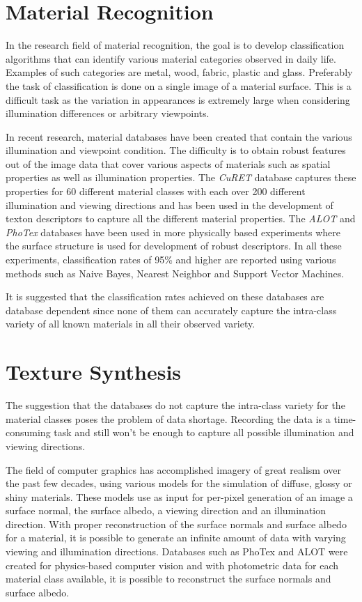 \hypertarget{MaterialRecognition}{
\section{Material Recognition}
}
In the research field of material recognition, the goal is to develop classification algorithms that can identify various material categories observed in daily life. Examples of such categories are metal, wood, fabric, plastic and glass. Preferably the task of classification is done on a single image of a material surface. This is a difficult task as the variation in appearances is extremely large when considering illumination differences or arbitrary viewpoints. 

In recent research, material databases have been created that contain the various illumination and viewpoint condition. The difficulty is to obtain robust features out of the image data that cover various aspects of materials such as spatial properties as well as illumination properties. The {\it CuRET} database captures these properties for 60 different material classes with each over 200 different illumination and viewing directions and has been used in the development of texton descriptors to capture all the different material properties. The {\it ALOT} and {\it PhoTex} databases have been used in more physically based experiments where the surface structure is used for development of robust descriptors. In all these experiments, classification rates of 95\% and higher are reported using various methods such as Naive Bayes, Nearest Neighbor and Support Vector Machines. 

It is suggested that the classification rates achieved on these databases are database dependent since none of them can accurately capture the intra-class variety of all known materials in all their observed variety.

\section{Texture Synthesis}
The suggestion that the databases do not capture the intra-class variety for the material classes poses the problem of data shortage. Recording the data is a time-consuming task and still won't be enough to capture all possible illumination and viewing directions. 

The field of computer graphics has accomplished imagery of great realism over the past few decades, using various models for the simulation of diffuse, glossy or shiny materials. These models use as input for per-pixel generation of an image a surface normal, the surface albedo, a viewing direction and an illumination direction. With proper reconstruction of the surface normals and surface albedo for a material, it is possible to generate an infinite amount of data with varying viewing and illumination directions. Databases such as PhoTex and ALOT were created for physics-based computer vision and with photometric data for each material class available, it is possible to reconstruct the surface normals and surface albedo. 


